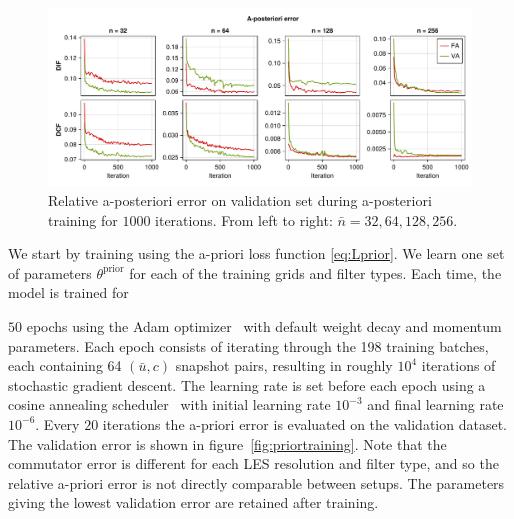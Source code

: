 \documentclass[preprint]{elsarticle}
\newcommand{\revone}[1]{#1}
\begin{document}
\begin{figure}
    \centering
    \includegraphics[width=1\textwidth]{figures_kolmogorov_posttraining.pdf}
    \caption{\revone{
        Relative a-posteriori error on validation set during a-posteriori
        training for $1000$ iterations. From left to right:
        $\bar{n} = 32, 64, 128, 256$.
    }}
    \label{fig:posttraining}
\end{figure}

We start by training using the a-priori loss function \eqref{eq:Lprior}.
We learn one set of parameters $\theta^\text{prior}$ for
each of the training grids and filter types. Each time, the model is trained for
\revone{
    
    $50$ epochs using the Adam optimizer~\cite{Kingma2017}
    with default weight decay and momentum parameters. 
    Each epoch consists of iterating through the 198 training batches, each
    containing 64 $(\bar{u}, c)$ snapshot pairs, resulting in roughly $10^4$
    iterations of stochastic gradient descent.
    The learning rate is set before each epoch using a cosine annealing
    scheduler~\cite{Loshchilov2017} with initial learning rate $10^{-3}$ and
    final learning rate $10^{-6}$.
    Every $20$ iterations the a-priori error is evaluated on the
    validation dataset.
    The validation error is shown in figure~\ref{fig:priortraining}. Note
    that the commutator error is different for each LES resolution and filter type,
    and so the relative a-priori error is not directly comparable between
    setups.}
The parameters giving the lowest validation error are retained after training.
\end{document}
